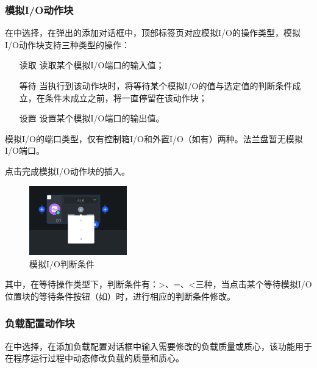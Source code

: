 



\subsubsection{模拟I/O动作块}
在中选择，在弹出的添加对话框中，顶部标签页对应模拟I/O的操作类型，模拟I/O动作块支持三种类型的操作：
\begin{itemize}[leftmargin=4.5em]
\item[读取] 读取某个模拟I/O端口的输入值；
\item[等待] 当执行到该动作块时，将等待某个模拟I/O的值与选定值的判断条件成立，在条件未成立之前，将一直停留在该动作块；
\item[设置] 设置某个模拟I/O端口的输出值。
\end{itemize}

模拟I/O的端口类型，仅有控制箱I/O和外置I/O（如有）两种。法兰盘暂无模拟I/O端口。

点击完成模拟I/O动作块的插入。





\begin{figure}[ht]
	\centering
	\includegraphics[height=3cm]{screen/3-13.png}
	\caption{模拟I/O判断条件}
	\label{fig:模拟IO判断条件}
\end{figure}

其中，在等待操作类型下，判断条件有：>、=、<三种，当点击某个等待模拟I/O位置块的等待条件按钮（如）时，进行相应的判断条件修改。

\subsubsection{负载配置动作块}
在中选择，在添加负载配置对话框中输入需要修改的负载质量或质心，该功能用于在程序运行过程中动态修改负载的质量和质心。

